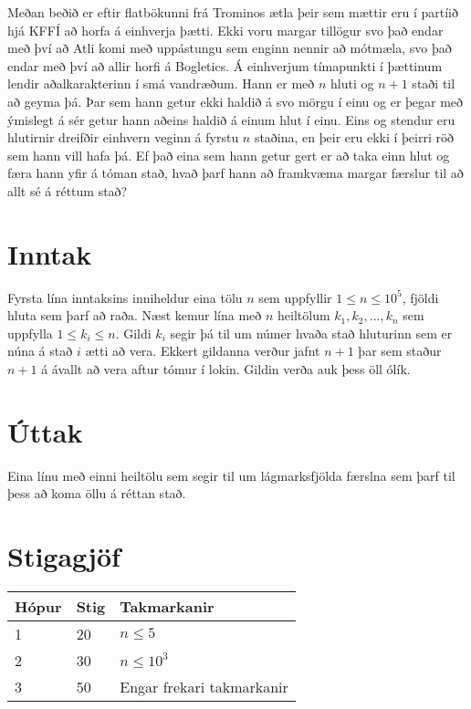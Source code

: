 %
Meðan beðið er eftir flatbökunni frá Trominos ætla þeir sem mættir eru í partíið hjá KFFÍ að horfa á einhverja þætti.
Ekki voru margar tillögur svo það endar með því að Atli komi með uppástungu sem enginn nennir að mótmæla,
	svo það endar með því að allir horfi á Bogletics.
Á einhverjum tímapunkti í þættinum lendir aðalkarakterinn í smá vandræðum.
Hann er með $n$ hluti og $n + 1$ staði til að geyma þá.
Þar sem hann getur ekki haldið á svo mörgu í einu og er þegar með ýmislegt á sér getur hann aðeins haldið á einum hlut í einu.
Eins og stendur eru hlutirnir dreifðir einhvern veginn á fyrstu $n$ staðina, en þeir eru ekki í þeirri röð sem hann vill hafa þá.
Ef það eina sem hann getur gert er að taka einn hlut og færa hann yfir á tóman stað,
	hvað þarf hann að framkvæma margar færslur til að allt sé á réttum stað?

\section*{Inntak}
Fyrsta lína inntaksins inniheldur eina tölu $n$ sem uppfyllir $1 \leq n \leq 10^5$, fjöldi hluta sem þarf að raða.
Næst kemur lína með $n$ heiltölum $k_1, k_2, \dots, k_n$ sem uppfylla $1 \leq k_i \leq n$.
Gildi $k_i$ segir þá til um númer hvaða stað hluturinn sem er núna á stað $i$ ætti að vera.
Ekkert gildanna verður jafnt $n + 1$ þar sem staður $n + 1$ á ávallt að vera aftur tómur í lokin.
Gildin verða auk þess öll ólík.

\section*{Úttak}
Eina línu með einni heiltölu sem segir til um lágmarksfjölda færslna sem þarf til þess að koma öllu á réttan stað.

\section*{Stigagjöf}
\begin{tabular}{|l|l|l|}
\hline
Hópur & Stig & Takmarkanir \\ \hline
1     & 20   & $n \leq 5$ \\ \hline
2     & 30   & $n \leq 10^3$ \\ \hline
3     & 50   & Engar frekari takmarkanir \\ \hline
\end{tabular}
